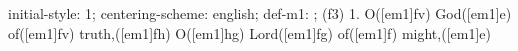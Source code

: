 initial-style: 1;
centering-scheme: english;
def-m1: \grealign;
(f3) 1. O([em1]fv) God([em1]e) of([em1]fv) truth,([em1]fh) O([em1]hg) Lord([em1]fg) of([em1]f) might,([em1]e)